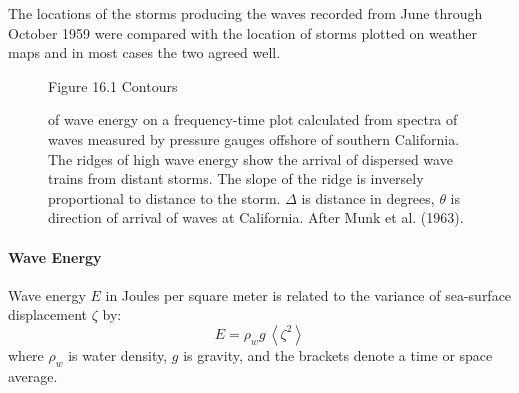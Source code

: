 The locations of the storms producing the waves recorded from June
through October 1959 were compared with the location of storms plotted
on weather maps and in most cases the two agreed well.

\begin{figure}[t!]
\footnotesize
Figure 16.1 Contours \rule{0mm}{4ex}of wave energy on a frequency-time
plot calculated from spectra of waves measured by pressure gauges
offshore of southern California. The ridges of high wave energy show
the arrival of dispersed wave trains from distant storms. The slope of
the ridge is inversely proportional to distance to the storm.
$\Delta$ is distance in degrees, $\theta$ is direction of arrival of
waves at California. After Munk et al. (1963).
\label{fig:dispersedwaves}
\vspace{-3ex}
\end{figure}

\paragraph{Wave Energy}
Wave energy $E$ in Joules per square meter is
related to the variance of sea-surface displacement $\zeta$ by:
 \begin{equation}
 E = \rho _{w} g \, \left< \zeta ^{2} \right>
 \end{equation}
where $\rho _{w}$ is water density, $g$ is gravity, and the brackets
denote a time or space average.

